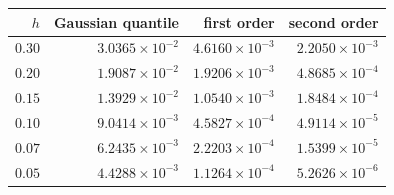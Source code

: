 \begin{tabular}{@{}rrrr@{}}
\toprule
$h$ & Gaussian quantile & first order & second order\\
\midrule
$0.30$ & $3.0365\times 10^{-2}$ & $4.6160\times 10^{-3}$ & $2.2050\times 10^{-3}$\\
$0.20$ & $1.9087\times 10^{-2}$ & $1.9206\times 10^{-3}$ & $4.8685\times 10^{-4}$\\
$0.15$ & $1.3929\times 10^{-2}$ & $1.0540\times 10^{-3}$ & $1.8484\times 10^{-4}$\\
$0.10$ & $9.0414\times 10^{-3}$ & $4.5827\times 10^{-4}$ & $4.9114\times 10^{-5}$\\
$0.07$ & $6.2435\times 10^{-3}$ & $2.2203\times 10^{-4}$ & $1.5399\times 10^{-5}$\\
$0.05$ & $4.4288\times 10^{-3}$ & $1.1264\times 10^{-4}$ & $5.2626\times 10^{-6}$\\
\bottomrule
\end{tabular}
